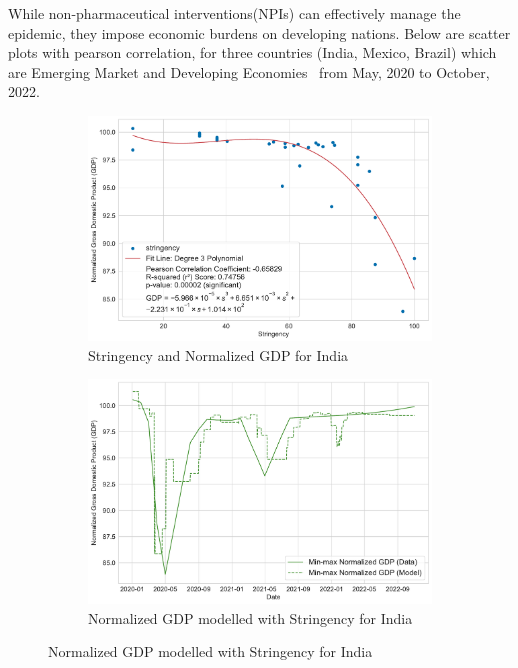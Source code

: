 \documentclass[tikz,fleqn,12pt]{wlscirep}
\begin{document}
While non-pharmaceutical interventions(NPIs) can effectively manage the epidemic, they impose economic burdens on developing nations. Below are scatter plots with pearson correlation, for three countries (India, Mexico, Brazil) which are Emerging Market and Developing Economies~\cite{IMFCovid} from May, 2020 to October, 2022.

\begin{figure}[htbp!]
  \centering
  \begin{subfigure}[t]{0.48\textwidth}
    \centering
    \includegraphics[width=\linewidth]{images/stringency_vs_gdp_IND.pdf}
    \caption{Stringency and Normalized GDP for India}
  \end{subfigure}
  \label{fig:stringency_vs_gdp_IND}
  \hfill
  \begin{subfigure}[t]{0.48\textwidth}
    \centering
    \includegraphics[width=\linewidth]{images/gdp_modelled_with_stringency_IND.pdf}
    \caption{Normalized GDP modelled with Stringency for India}
  \end{subfigure}
  \label{fig:gdp_modelled_with_stringency_IND}


\end{figure}
\end{document}
